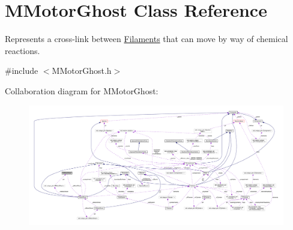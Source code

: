 \hypertarget{classMMotorGhost}{\section{M\+Motor\+Ghost Class Reference}
\label{classMMotorGhost}
}


Represents a cross-\/link between \hyperlink{classFilament}{Filaments} that can move by way of chemical reactions.  




{\ttfamily \#include $<$M\+Motor\+Ghost.\+h$>$}



Collaboration diagram for M\+Motor\+Ghost\+:
\nopagebreak
\begin{figure}[H]
\begin{center}
\leavevmode
\includegraphics[width=350pt]{classMMotorGhost__coll__graph}
\end{center}
\end{figure}
